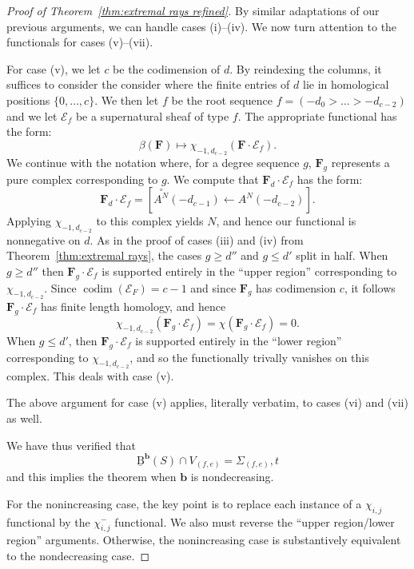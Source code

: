 \documentclass[12pt]{amsart}
\theoremstyle{definition}
\theoremstyle{remark}
\newcommand{\codim}{\operatorname{codim}}
\newcommand{\bb}{\mathbf{b}}
\newcommand{\cE}{\mathcal{E}}
\newcommand{\FF}{\mathbf{F}}
\newcommand{\zp}{\circ}
\newcommand{\BBQ}{\underline{\mathrm{B}}}
\begin{document}
\begin{proof}[Proof of Theorem~\ref{thm:extremal rays refined}]
By similar adaptations of our previous arguments, we can handle cases (i)--(iv).  We now turn attention to the functionals for cases (v)--(vii).  

For case (v), we let $c$ be the codimension of $d$.  By reindexing the columns, it suffices to consider the consider where the finite entries of $d$ lie in homological positions $\{0,\dots,c\}$.  We then let $f$ be the root sequence $f=(-d_0>\dots >-d_{c-2})$ and we let $\cE_f$ be a supernatural sheaf of type $f$.  The appropriate functional has the form:
\[
\beta(\FF)\mapsto \chi_{-1,d_{c-2}}(\FF\cdot \cE_f).
\]
We continue with the notation where, for a degree sequence $g$, $\FF_g$ represents a pure complex corresponding to $g$.  We compute that $\FF_d\cdot \cE_f$ has the form:
\[
\FF_d\cdot \cE_f=\left[\overset{\zp}{A^N}(-d_{c-1})\gets A^N(-d_{c-2}) \right].
\]
Applying $\chi_{-1,d_{c-2}}$ to this complex yields $N$, and hence our functional is nonnegative on $d$.  As in the proof of cases (iii) and (iv) from Theorem~\ref{thm:extremal rays}, the cases $g\geq d''$ and $g\leq d'$ split in half.  When $g\geq d''$ then $\FF_g\cdot \cE_f$ is supported entirely in the ``upper region'' corresponding to $\chi_{-1,d_{c-2}}$.  Since $\codim(\cE_F)=c-1$ and since $\FF_g$ has codimension $c$, it follows $\FF_g\cdot \cE_f$ has finite length homology, and hence
\[
\chi_{-1,d_{c-2}}(\FF_g\cdot \cE_f)=\chi(\FF_g\cdot \cE_f)=0.
\]
When $g\leq d'$, then $\FF_g\cdot \cE_f$ is supported entirely in the ``lower region'' corresponding to $\chi_{-1,d_{c-2}}$, and so the functionally trivally vanishes on this complex.  This deals with case (v).


The above argument for case (v) applies, literally verbatim, to cases (vi) and (vii) as well. 

We have thus verified that
\[
\BBQ^{\bb}(S)\cap V_{(f,e)}=\Sigma_{(f,e)},t
\]
and this implies the theorem when $\bb$ is nondecreasing.  

For the nonincreasing case, the key point is to replace each instance of a $\chi_{i,j}$ functional by the $\chi^{-}_{i,j}$ functional.  We also must reverse the ``upper region/lower region'' arguments.  Otherwise, the nonincreasing case is substantively equivalent to the nondecreasing case.
\end{proof}


\end{document}
